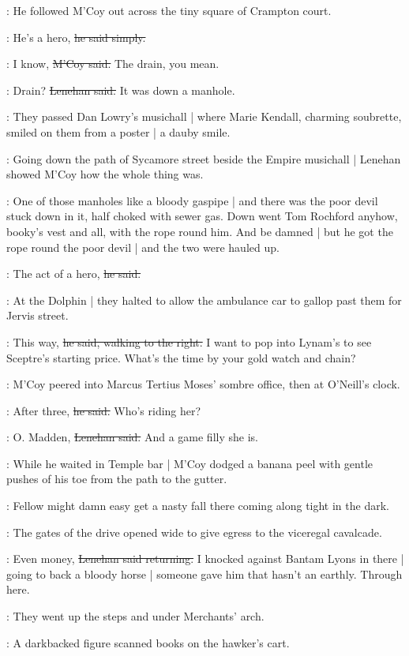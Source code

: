 :
He followed M'Coy out
across the tiny square of Crampton court.

\lenehan:
He's a hero,
\sout{he said simply.}

\mcoy:
I know,
\sout{M'Coy said.}
The drain, you mean.

\lenehan:
Drain?
\sout{Lenehan said.}
It was down a manhole.

:
They passed Dan Lowry's musichall |
where Marie Kendall,
charming soubrette,
smiled on them from a poster |
a dauby smile.

:
Going down the path of Sycamore street
beside the Empire musichall |
Lenehan showed M'Coy how the whole thing was.

\lenehan:
One of those manholes like a bloody gaspipe |
and there was the poor devil stuck down in it,
half choked with sewer gas.
Down went Tom Rochford anyhow,
booky's vest and all,
with the rope round him.
And be damned |
but he got the rope round the poor devil |
and the two were hauled up.

\lenehan:
The act of a hero,
\sout{he said.}

:
At the Dolphin |
they halted to allow the ambulance car
to gallop past them for Jervis street.

\lenehan:
This way,
\sout{he said,
walking to the right.}
I want to pop into Lynam's
to see Sceptre's starting price.
What's the time by your gold watch and chain?

:
M'Coy peered into Marcus Tertius Moses' sombre office,
then at O'Neill's clock.

\mcoy:
After three,
\sout{he said.}
Who's riding her?

\lenehan:
O. Madden,
\sout{Lenehan said.}
And a game filly she is.

:
While he waited in Temple bar |
M'Coy dodged a banana peel
with gentle pushes of his toe
from the path
to the gutter.

\mcoy:
Fellow might damn
easy get a nasty fall there
coming along tight in the dark.

:
The gates of the drive opened wide
to give egress to the viceregal cavalcade.

\lenehan:
Even money,
\sout{Lenehan said returning.}
I knocked against Bantam Lyons in there |
going to back a bloody horse |
someone gave him that hasn't an earthly.
Through here.

:
They went up the steps and under Merchants' arch.

\begin{mdframed}
    :
    A darkbacked figure scanned books on the hawker's cart.
\end{mdframed}

